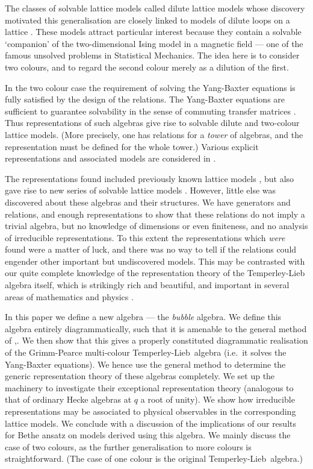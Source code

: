 \documentclass[12pt]{iopart}
\newcommand{\TL}{Temperley-Lieb}
\begin{document}
The classes of solvable lattice models called dilute lattice models
\cite{R92,WNS92,ZPG95} whose discovery motivated this generalisation
are closely linked to models of dilute loops on a lattice
\cite{BNW89,WN93}.  These models attract particular interest because
they contain a solvable `companion' of the two-dimensional Ising model
in a magnetic field \cite{WNS92,GN96,GN97} --- one of the famous
unsolved problems in Statistical Mechanics. The idea here is to
consider two colours, and to regard the second colour merely as a
dilution of the first.

In the two colour case the requirement of solving the Yang-Baxter
equations is fully satisfied by the design of the relations.  The
Yang-Baxter equations are sufficient to guarantee solvability in the
sense of commuting transfer matrices \cite{Baxter,WDA89}.  Thus
representations of such algebras give rise to solvable dilute and
two-colour lattice models.  (More precisely, one has relations for a
{\em tower}\/ of algebras, and the representation must be defined for
the whole tower.)  Various explicit representations and associated
models are considered in \cite{GP93,G94a,G94b,GW95a,GW95b,G96}.

The representations found included previously known lattice models
\cite{G94a,G94b}, but also gave rise to new series of solvable lattice
models \cite{GW95a,GW95b,G96}.  However, little else was discovered
about these algebras and their structures.  We have generators and
relations, and enough representations to show that these relations do
not imply a trivial algebra, but no knowledge of dimensions or even
finiteness, and no analysis of irreducible representations.  To this
extent the representations which {\em were}\/ found were a matter of
luck, and there was no way to tell if the relations could engender
other important but undiscovered models.  This may be contrasted with
our quite complete knowledge of the representation theory of the
Temperley-Lieb algebra itself, which is strikingly rich and
beautiful, and important in several areas of mathematics and physics
\cite{DonkinX,KS92a,KS92b,M91,JonesX,Khovanov}.

In this paper we define a new algebra --- the {\em bubble}\/ algebra.
We define this algebra entirely diagrammatically, such that it is
amenable to the general method of \cite[\S9.5]{M91},\cite{MS94b}.  We
then show that this gives a properly constituted diagrammatic
realisation of the Grimm-Pearce multi-colour \TL\ algebra (i.e.\ it
solves the Yang-Baxter equations).  We hence use the general method
to determine the generic representation theory of these algebras
completely.  We set up the machinery to investigate their exceptional
representation theory (analogous to that of ordinary Hecke algebras at
$q$ a root of unity).  We show how irreducible representations may be
associated to physical observables in the corresponding lattice
models.  We conclude with a discussion of the implications of our
results for Bethe ansatz on models derived using this algebra.  We
mainly discuss the case of two colours, as the further generalisation
to more colours is straightforward.  (The case of one colour is the
original \TL\ algebra.)
\end{document}
